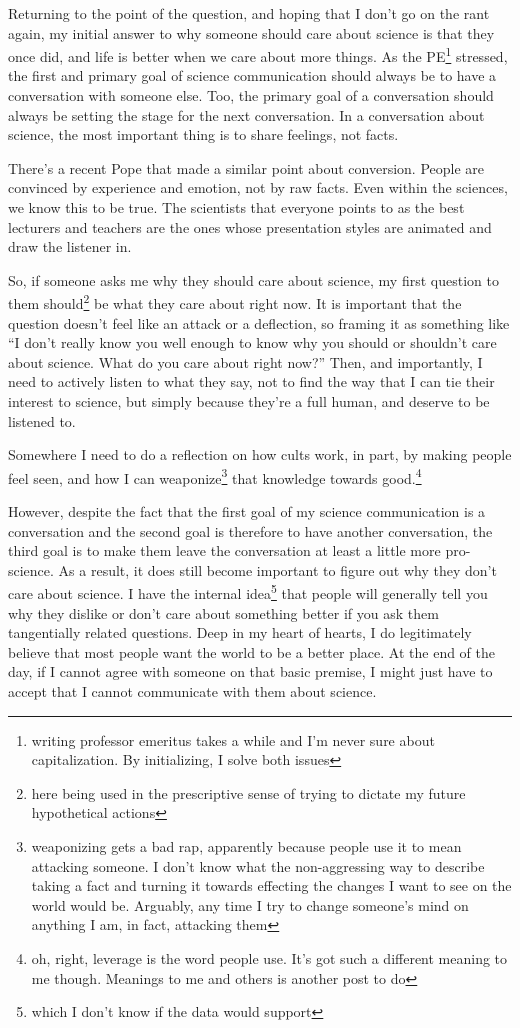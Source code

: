 \documentclass[12pt]{article}[titlepage]
\newcommand{\say}[1]{``#1''}
\renewcommand{\,}{\textsuperscript{,}}
\begin{document}
Returning to the point of the question, and hoping that I don't go on the rant again, my initial answer to why someone should care about science is that they once did, and life is better when we care about more things.  
As the PE\footnote{writing professor emeritus takes a while and I'm never sure about capitalization. By initializing, I solve both issues} stressed, the first and primary goal of science communication should always be to have a conversation with someone else.  
Too, the primary goal of a conversation should always be setting the stage for the next conversation.  
In a conversation about science, the most important thing is to share feelings, not facts.

There's a recent Pope that made a similar point about conversion.  
People are convinced by experience and emotion, not by raw facts.  
Even within the sciences, we know this to be true.  
The scientists that everyone points to as the best lecturers and teachers are the ones whose presentation styles are animated and draw the listener in.

So, if someone asks me why they should care about science, my first question to them should\footnote{here being used in the prescriptive sense of trying to dictate my future hypothetical actions} be what they care about right now.  
It is important that the question doesn't feel like an attack or a deflection, so framing it as something like \say{I don't really know you well enough to know why you should or shouldn't care about science. What do you care about right now?}  
Then, and importantly, I need to actively listen to what they say, not to find the way that I can tie their interest to science, but simply because they're a full human, and deserve to be listened to.

Somewhere I need to do a reflection on how cults work, in part, by making people feel seen, and how I can weaponize\footnote{weaponizing gets a bad rap, apparently because people use it to mean attacking someone. I don't know what the non-aggressing way to describe taking a fact and turning it towards effecting the changes I want to see on the world would be. Arguably, any time I try to change someone's mind on anything I am, in fact, attacking them} that knowledge towards good.\footnote{oh, right, leverage is the word people use. It's got such a different meaning to me though. Meanings to me and others is another post to do}

However, despite the fact that the first goal of my science communication is a conversation and the second goal is therefore to have another conversation, the third goal is to make them leave the conversation at least a little more pro-science.  
As a result, it does still become important to figure out why they don't care about science.  
I have the internal idea\footnote{which I don't know if the data would support} that people will generally tell you why they dislike or don't care about something better if you ask them tangentially related questions.  
Deep in my heart of hearts, I do legitimately believe that most people want the world to be a better place.  
At the end of the day, if I cannot agree with someone on that basic premise, I might just have to accept that I cannot communicate with them about science.
\end{document}

